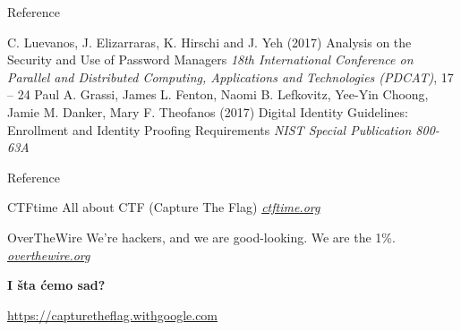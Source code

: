 \documentclass[aspectratio=169,xcolor=dvipsnames]{beamer}
\begin{document}

\begin{frame}{Reference}
    \footnotesize{
        \begin{thebibliography}{99}

                C. Luevanos, J. Elizarraras, K. Hirschi and J. Yeh (2017)
                \newblock Analysis on the Security and Use of Password Managers
                \newblock \emph{18th International Conference on Parallel and
                Distributed Computing, Applications and Technologies (PDCAT)},
                17 -- 24
             Paul A. Grassi, James L. Fenton,
                Naomi B. Lefkovitz, Yee-Yin Choong, Jamie M. Danker,
                Mary F. Theofanos (2017)
                \newblock Digital Identity Guidelines: Enrollment and Identity
                Proofing Requirements
                \newblock \emph{NIST Special Publication 800-63A}

        \end{thebibliography}
    }
\end{frame}


\begin{frame}{Reference}
    \footnotesize{
        \begin{thebibliography}{99}

             CTFtime
                \newblock All about CTF (Capture The Flag)
                \newblock \emph{\url{ctftime.org}}

             OverTheWire
                \newblock We're hackers, and we are good-looking.
                We are the 1\%.
                \newblock \emph{\url{overthewire.org}}

        \end{thebibliography}
    }
\end{frame}


\begin{frame}

    \Huge{\centerline{\textbf{I šta ćemo sad?}}}

    \vspace{2em}

    \pause
    \small{\centerline{\url{https://capturetheflag.withgoogle.com}}}

\end{frame}

\end{document}
